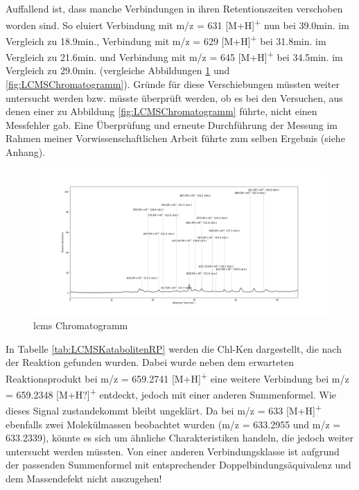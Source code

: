 Auffallend ist, dass manche Verbindungen in ihren Retentionszeiten verschoben worden sind. So eluiert Verbindung mit m/z = 631 [M+H]\textsuperscript{+} nun bei 39.0min. im Vergleich zu 18.9min., Verbindung mit m/z = 629 [M+H]\textsuperscript{+} bei 31.8min. im Vergleich zu 21.6min. und Verbindung mit m/z = 645 [M+H]\textsuperscript{+} bei 34.5min. im Vergleich zu 29.0min. (vergleiche Abbildungen \ref{fig:LCMSCChromatogrammRP} und \ref{fig:LCMSChromatogramm}). Gründe für diese Verschiebungen müssten weiter untersucht werden bzw. müsste überprüft werden, ob es bei den Versuchen, aus denen einer zu Abbildung \ref{fig:LCMSChromatogramm} führte, nicht einen Messfehler gab. Eine Überprüfung und erneute Durchführung der Messung im Rahmen meiner Vorwissenschaftlichen Arbeit führte zum selben Ergebnis (siehe Anhang). 

\begin{figure}[!htbp]
  \centering
  \includegraphics[width=1.4\textwidth, center]{figures/Kapitel6/Reaktion3h/Kuerbis_Analyse_Reaktion3h_Ganzes_Spektrum.png}
  \caption[LC-MS Chromatogramm nach 3h Reaktionsdauer, Quelle: Autor]{\gls{lcms} Chromatogramm}
  \label{fig:LCMSCChromatogrammRP}
\end{figure}

In Tabelle \ref{tab:LCMSKatabolitenRP} werden die \gls{Chl-K}en dargestellt, die nach der Reaktion gefunden wurden. Dabei wurde neben dem erwarteten Reaktionsprodukt bei m/z = 659.2741 [M+H]\textsuperscript{+} eine weitere Verbindung bei m/z = 659.2348 [M+H?]\textsuperscript{+} entdeckt, jedoch mit einer anderen Summenformel. Wie dieses Signal zustandekommt bleibt ungeklärt. Da bei m/z = 633 [M+H]\textsuperscript{+} ebenfalls zwei Molekülmassen beobachtet wurden (m/z = 633.2955 und m/z = 633.2339), könnte es sich um ähnliche Charakteristiken handeln, die jedoch weiter untersucht werden müssten. Von einer anderen Verbindungsklasse ist aufgrund der passenden Summenformel mit entsprechender Doppelbindungsäquivalenz und dem Massendefekt nicht auszugehen! \\

